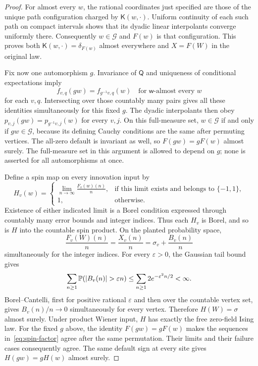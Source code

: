 \begin{proof}
For almost every $w$, the rational coordinates just specified are
those of the unique path configuration charged by $\mathsf K(w,\cdot)$.
Uniform continuity of each such path on compact intervals shows
that its dyadic linear interpolants converge uniformly there.
Consequently $w\in\mathcal G$ and $F(w)$ is that configuration.
This proves both $\mathsf K(w,\cdot)=\delta_{F(w)}$ almost everywhere
and $X=F(W)$ in the original law.

Fix now one automorphism $g$. Invariance of $\mathsf Q$ and
uniqueness of conditional expectations imply
\begin{equation}\label{eq:recovery-coordinate-equivariance}
 f_{v,q}(gw)=f_{g^{-1}v,q}(w)
       \quad\text{for $\mathsf w$-almost every }w
\end{equation}
for each $v,q$. Intersecting over those countably many pairs gives
all these identities simultaneously for this fixed $g$. The dyadic
interpolants then obey
$p_{v,j}(gw)=p_{g^{-1}v,j}(w)$ for every $v,j$. On this full-measure
set, $w\in\mathcal G$ if and only if $gw\in\mathcal G$, because
its defining Cauchy conditions are the same after permuting vertices.
The all-zero default is invariant as well, so
$F(gw)=gF(w)$ almost surely. The full-measure set in this argument
is allowed to depend on $g$; none is asserted for all automorphisms
at once.

Define a spin map on every innovation input by
\begin{equation}\label{eq:spin-factor}
 H_v(w)=
 \begin{cases}
 \displaystyle\lim_{n\to\infty}\frac{F_v(w)(n)}{n},
   &\text{if this limit exists and belongs to $\{-1,1\}$},\\[2mm]
 1,&\text{otherwise}.
 \end{cases}
\end{equation}
Existence of either indicated limit is a Borel condition expressed
through countably many error bounds and integer indices. Thus each
$H_v$ is Borel, and so is $H$ into the countable spin product.
On the planted probability space,
\[
 \frac{F_v(W)(n)}n=\frac{X_v(n)}n
      =\sigma_v+\frac{B_v(n)}n
\]
simultaneously for the integer indices. For every $\varepsilon>0$,
the Gaussian tail bound gives
\[
 \sum_{n\ge1}\P(|B_v(n)|>\varepsilon n)
       \le\sum_{n\ge1}2e^{-\varepsilon^2n/2}<\infty.
\]
Borel--Cantelli, first for positive rational $\varepsilon$ and then
over the countable vertex set, gives $B_v(n)/n\to0$ simultaneously
for every vertex. Therefore $H(W)=\sigma$ almost surely. Under
product Wiener input, $H$ has exactly the free zero-field Ising law.
For the fixed $g$ above, the identity $F(gw)=gF(w)$ makes the
sequences in~\eqref{eq:spin-factor} agree after the same permutation.
Their limits and their failure cases consequently agree. The same
default sign at every site gives $H(gw)=gH(w)$ almost surely.


\end{proof}
